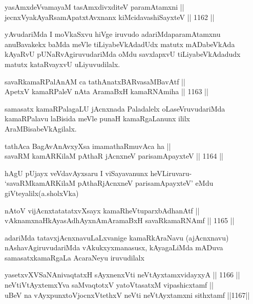 \begin{shl}
yasAmxdeVvamayaM tasAmxdivxditeV paramAtamxni || \\
jecnxVyakAyaRsamApatxtAvxnanx kiMcidavashiSayxteV \hfill || 1162 ||  
\end{shl}

\begin{artha}
yAvudariMda I moVkaSxvu hiVge iruvudo adariMda\break paramAtamxnu anuBavakekx baMda meVle tiLiyabeVkAdadUdx matutx mADabeVkAda kAyaRvU pUNaRvAgiruvudariMda  oMdu savxlapxvU tiLiyabeVkAdadudx matutx kataRvayxvU uLiyuvudilalx.
\end{artha}

\begin{shl}
savaRkamaRPalAnAM ca tathA\s natxBARvasaMBavAtf || \\
ApetxV kamaRPaleV nAta AramaBxH kamaRNAmiha \hfill || 1163 ||  
\end{shl}

\begin{artha}
samasatx kamaRPalagaLU jAcnxnada Paladalelx oLaseVruvudariMda kamaRPalavu laBisida meVle punaH kamaRgaLanunx ililx AraMBisabeVkAgilalx.
\end{artha}

\begin{shl}
tathAca BagAvAnAvxyXsa imamathaRmuvAca ha || \\
savaRM kamARKilaM pAthaR jAcnxneV parisamApayxteV \hfill || 1164 ||  
\end{shl}

\begin{artha}
hAgU pUjayx veVdavAyxsaru I viSayavanunx heVLiruvaru- `savaRMkamARKilaM pAthaRjAcnxneV parisamApayxteV' eMdu giVteyalilx(a.sholxVka)
\end{artha}

\begin{shl}
nAtoV vijAcnxtatatatxvXsayx kamaRheVtuparxbAdhanAtf || \\
vAknamxnaHkAyasAdhAyxnAmAramaBxH savaRkamaRNAmf \hfill || 1165 ||  
\end{shl}

\begin{artha}
adariMda tatavxjAcnxnavuLaLxvanige kamaRkAraNavu (ajAcnxnavu) nAshavAgiruvudariMda vAkukxyxmanasusx, kAyagaLiMda mADuva samasatxkamaRgaLa AcaraNeyu iruvudilalx
\end{artha}

\begin{shl}
yasetxvXVSaNAnivaqtatxH sAyxnenxVti neVtAyxtamxvidayxyA \hfill || 1166 ||  \\
neVtiVtAyxtemxYva saMvaqtotxV yatoV\s tasatxM vipashicxtamf ||  \\
uBeV na vAyxpunxtoV\s jocnxVtethxV neVti neVtAyxtamxni sithxtamf \hfill ||1167||  
\end{shl}

